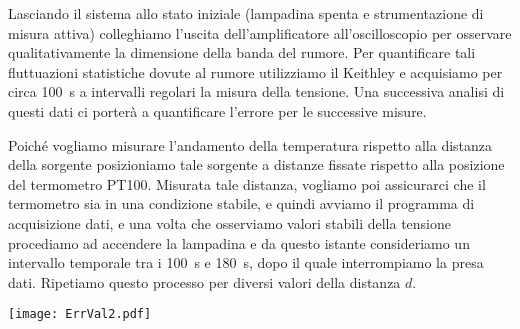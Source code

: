 \documentclass[
    rmp,
    reprint, 
    superscriptaddress, 
    altaffilletter, 
    amsmath, 
    amssymb,
    a4paper]{revtex4-2}
\begin{document}
Lasciando il sistema allo stato iniziale (lampadina spenta e strumentazione di misura attiva) colleghiamo l'uscita dell'amplificatore all'oscilloscopio per osservare qualitativamente la dimensione della banda del rumore. 
Per quantificare tali fluttuazioni statistiche dovute al rumore utilizziamo il Keithley e acquisiamo per circa \SI{100}{\second} a intervalli regolari la misura della tensione. Una successiva analisi di questi dati ci porterà a quantificare l'errore per le successive misure.

Poiché vogliamo misurare l'andamento della temperatura rispetto alla distanza della sorgente posizioniamo tale sorgente a distanze fissate rispetto alla posizione del termometro PT100. Misurata tale distanza, vogliamo poi assicurarci che il termometro sia in una condizione stabile, e quindi avviamo il programma di acquisizione dati, e una volta che osserviamo valori stabili della tensione procediamo ad accendere la lampadina e da questo istante consideriamo un intervallo temporale tra i \SI{100}{\second} e \SI{180}{\second}, dopo il quale interrompiamo la presa dati. Ripetiamo questo processo per diversi  valori della distanza $d$.

\begin{figure*}
    \texttt{[image: ErrVal2.pdf]}
    \caption{Per la valutazione dell'errore abbiamo raccolto alcuni dati lasciando la strumentazione in tensione e la sorgente spenta. Questi dati, nel grafico in alto al centro (Dati pre-analisi V(t)) mostrano un comportamento riconducibile ad un segnale sinusoidale a bassa frequenza, e la relativa distribuzione, nell'istogramma (Dati pre-analisi), non è infatti riconducibile ad una curva gaussiana come atteso per una distribuzione di probabilità legata all'errore. In basso al centro (Dati senza componente V(t)) invece troviamo i dati trattati sottraendo la componente periodica sinusoidale, mostra un comportamento che non è imputabile alla presenza di altri componenti periodiche. Infatti la relativa distribuzione è ben più simile ad una distribuzione gaussiana, come osserviamo a sinistra in rosso. Questa componente però non può essere giustificata in nessun modo fisicamente, quindi ci preoccupiamo di dividere il segnale in batch di circa 50 punti di acquisizione l'uno e consideriamo quelli dove la curva non sembra oscillare periodicamente. Realizziamo dai batch 1, 4 e 5 quindi gli istogrammi (in alto a destra) e sommando i dati relativi a questi tre batch, osserviamo in un istogramma complessivo un comportamento che può essere gaussiano. Da quest'ultimo (in basso a destra) troviamo quindi il valore della deviazione standard ($1\sigma$) di \SI{1}{\milli\volt}.}
    \label{fig:errore}
\end{figure*}
\end{document}
